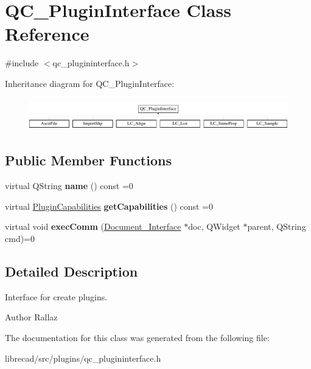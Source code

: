 \hypertarget{classQC__PluginInterface}{\section{Q\-C\-\_\-\-Plugin\-Interface Class Reference}
\label{classQC__PluginInterface}
}


{\ttfamily \#include $<$qc\-\_\-plugininterface.\-h$>$}

Inheritance diagram for Q\-C\-\_\-\-Plugin\-Interface\-:\begin{figure}[H]
\begin{center}
\leavevmode
\includegraphics[height=1.424936cm]{classQC__PluginInterface}
\end{center}
\end{figure}
\subsection*{Public Member Functions}
\begin{DoxyCompactItemize}
\item 
\hypertarget{classQC__PluginInterface_a9fae6781e8755f3f7a3069e2909bbc06}{virtual Q\-String {\bfseries name} () const =0}\label{classQC__PluginInterface_a9fae6781e8755f3f7a3069e2909bbc06}

\item 
\hypertarget{classQC__PluginInterface_a1a0b3d6403228a47131a5d45111f3b75}{virtual \hyperlink{classPluginCapabilities}{Plugin\-Capabilities} {\bfseries get\-Capabilities} () const =0}\label{classQC__PluginInterface_a1a0b3d6403228a47131a5d45111f3b75}

\item 
\hypertarget{classQC__PluginInterface_abe6734d5ba583317ee96d90aabc694ad}{virtual void {\bfseries exec\-Comm} (\hyperlink{classDocument__Interface}{Document\-\_\-\-Interface} $\ast$doc, Q\-Widget $\ast$parent, Q\-String cmd)=0}\label{classQC__PluginInterface_abe6734d5ba583317ee96d90aabc694ad}

\end{DoxyCompactItemize}


\subsection{Detailed Description}
Interface for create plugins.

\begin{DoxyAuthor}{Author}
Rallaz 
\end{DoxyAuthor}


The documentation for this class was generated from the following file\-:\begin{DoxyCompactItemize}
\item 
librecad/src/plugins/qc\-\_\-plugininterface.\-h\end{DoxyCompactItemize}

